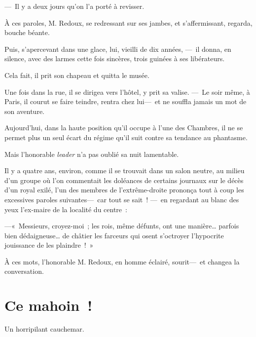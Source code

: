 \documentclass[french,twoside]{book} %
\newcommand{\salute}[1]{\bigbreak{#1}\par\medbreak}
\begin{document}
— Il y a deux jours qu’on l’a porté à revisser.\par
À ces paroles, M. Redoux, se redressant sur ses jambes, et s’affermissant, regarda, bouche béante.\par
Puis, s’apercevant dans une glace, lui, vieilli de dix années, — il donna, en silence, avec des larmes cette fois sincères, trois guinées à ses libérateurs.\par
Cela fait, il prit son chapeau et quitta le musée.\par
   Une fois dans la rue, il se dirigea vers l’hôtel, y prit sa valise. — Le soir même, à Paris, il courut se faire teindre, rentra chez lui— et ne souffla jamais un mot de son aventure.\par
Aujourd’hui, dans la haute position qu’il occupe à l’une des Chambres, il ne se permet plus un seul écart du régime qu’il suit contre sa tendance au phantasme.\par
Mais l’honorable \emph{leader} n’a pas oublié sa nuit lamentable.\par
Il y a quatre ans, environ, comme il se trouvait dans un salon neutre, au milieu d’un groupe où l’on commentait les doléances de certains journaux sur le décès d’un royal exilé, l’un des membres de l’extrême-droite prononça tout à coup les excessives paroles suivantes— car tout se sait ! — en regardant au blanc des yeux l’ex-maire de la localité du centre :\par
—« Messieurs, croyez-moi ; les rois, même défunts, ont une manière… parfois bien dédaigneuse… de châtier les farceurs qui osent   s’octroyer l’hypocrite jouissance de les plaindre ! »\par
À ces mots, l’honorable M. Redoux, en homme éclairé, sourit— et changea la conversation.
 \section[{Ce mahoin !}]{Ce mahoin !}\renewcommand{\leftmark}{Ce mahoin !}


\salute{À Monsieur Louis Welden Hawkins}
\noindent Un horripilant cauchemar.\par
\end{document}
